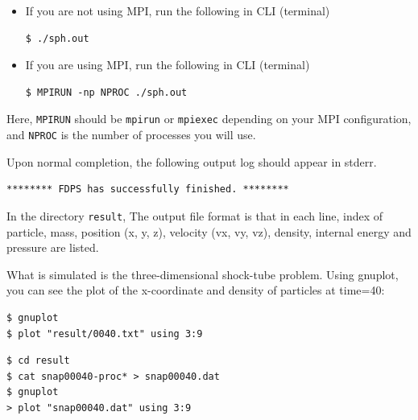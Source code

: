\begin{itemize}
\item If you are not using MPI, run the following in CLI (terminal)
\begin{screen}
\begin{verbatim}
$ ./sph.out
\end{verbatim}
\end{screen}
  
\item If you are using MPI, run the following in CLI (terminal)
\begin{screen}
\begin{verbatim}
$ MPIRUN -np NPROC ./sph.out
\end{verbatim}
\end{screen}
\end{itemize}
Here, \texttt{MPIRUN} should be \texttt{mpirun} or \texttt{mpiexec} depending on your MPI configuration, and \texttt{NPROC} is the number of processes you will use.

Upon normal completion, the following output log should appear in stderr. 
\begin{screen}
\begin{verbatim}
******** FDPS has successfully finished. ********
\end{verbatim}
\end{screen}

In the directory \texttt{result},
The output file format is that in each line, index of particle, mass, position (x, y, z), velocity (vx, vy, vz), density, internal energy and pressure are listed.

What is simulated is the three-dimensional shock-tube problem. Using gnuplot, you can see the plot of the x-coordinate and density of particles at time=40:
\ifCpp %
\begin{screen}
\begin{verbatim}
$ gnuplot
$ plot "result/0040.txt" using 3:9
\end{verbatim}
\end{screen}
\endifCpp
\ifIF %
\begin{screen}
\begin{verbatim}
$ cd result
$ cat snap00040-proc* > snap00040.dat
$ gnuplot
> plot "snap00040.dat" using 3:9
\end{verbatim}
\end{screen}
\endifIF


